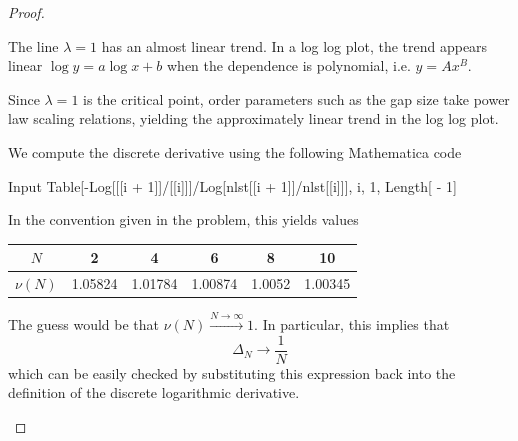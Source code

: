 \begin{proof}
\begin{parts}
\begin{center}
\end{center}

The line $\lambda=1$ has an almost linear trend. In a log log plot, the trend appears linear $\log y = a\log x + b$ when the dependence is polynomial, i.e. $y = Ax^B$. 

Since $\lambda=1$ is the critical point, order parameters such as the gap size take power law scaling relations, yielding the approximately linear trend in the log log plot.

\item We compute the discrete derivative using the following Mathematica code
\begin{mmaCell}{Input}
	Table[-Log[[[i + 1]]/[[i]]]/Log[nlst[[i + 1]]/nlst[[i]]], {i, 1, Length[ - 1}]
	\end{mmaCell}
	In the convention given in the problem, this yields values
	
	\begin{center}
	\begin{tabular}{cccccc}
		\toprule
	$N$	& 2 & 4 & 6 & 8 & 10\\\midrule
$\nu(N)$ & 1.05824&  1.01784 & 1.00874 & 1.0052 & 1.00345\\\bottomrule
	\end{tabular}
	\end{center}
	
	The guess would be that $\nu(N)\xrightarrow{N\to\infty}1$. In particular, this implies that
	\[\Delta_N \to \frac 1N\]
	which can be easily checked by substituting this expression back into the definition of the discrete logarithmic derivative.\qedhere
	\end{parts}
\end{proof}

